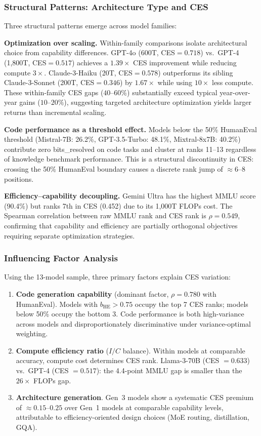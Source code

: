 \documentclass[12pt]{article}
\begin{document}
\subsubsection{Structural Patterns: Architecture Type and CES}

Three structural patterns emerge across model families:

\textbf{Optimization over scaling.} Within-family comparisons isolate architectural choice from capability differences. GPT-4o (600T, CES$=0.718$) vs.\ GPT-4 (1,800T, CES$=0.517$) achieves a $1.39\times$ CES improvement while reducing compute $3\times$. Claude-3-Haiku (20T, CES$=0.578$) outperforms its sibling Claude-3-Sonnet (200T, CES$=0.346$) by $1.67\times$ while using $10\times$ less compute. These within-family CES gaps ($40$--$60\%$) substantially exceed typical year-over-year gains ($10$--$20\%$), suggesting targeted architecture optimization yields larger returns than incremental scaling.

\textbf{Code performance as a threshold effect.} Models below the 50\% HumanEval threshold (Mistral-7B: 26.2\%, GPT-3.5-Turbo: 48.1\%, Mixtral-8x7B: 40.2\%) contribute zero bits\_resolved on code tasks and cluster at ranks 11--13 regardless of knowledge benchmark performance. This is a structural discontinuity in CES: crossing the 50\% HumanEval boundary causes a discrete rank jump of ${\approx}6$--$8$ positions.

\textbf{Efficiency--capability decoupling.} Gemini Ultra has the highest MMLU score (90.4\%) but ranks 7th in CES (0.452) due to its 1,000T FLOPs cost. The Spearman correlation between raw MMLU rank and CES rank is $\rho = 0.549$, confirming that capability and efficiency are partially orthogonal objectives requiring separate optimization strategies.

\subsubsection{Influencing Factor Analysis}

Using the 13-model sample, three primary factors explain CES variation:

\begin{enumerate}
    \item \textbf{Code generation capability} (dominant factor, $\rho = 0.780$ with HumanEval). Models with $b_{\text{HE}} > 0.75$ occupy the top 7 CES ranks; models below 50\% occupy the bottom 3. Code performance is both high-variance across models and disproportionately discriminative under variance-optimal weighting.
    \item \textbf{Compute efficiency ratio} ($I/C$ balance). Within models at comparable accuracy, compute cost determines CES rank. Llama-3-70B (CES $= 0.633$) vs.\ GPT-4 (CES $= 0.517$): the 4.4-point MMLU gap is smaller than the $26\times$ FLOPs gap.
    \item \textbf{Architecture generation}. Gen~3 models show a systematic CES premium of ${\approx}0.15$--$0.25$ over Gen~1 models at comparable capability levels, attributable to efficiency-oriented design choices (MoE routing, distillation, GQA).
\end{enumerate}
\end{document}
